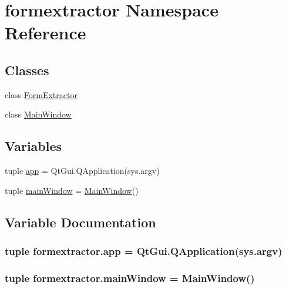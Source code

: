 \hypertarget{namespaceformextractor}{}\section{formextractor Namespace Reference}
\label{namespaceformextractor}
\subsection*{Classes}
\begin{DoxyCompactItemize}
\item 
class \hyperlink{classformextractor_1_1FormExtractor}{Form\+Extractor}
\item 
class \hyperlink{classformextractor_1_1MainWindow}{Main\+Window}
\end{DoxyCompactItemize}
\subsection*{Variables}
\begin{DoxyCompactItemize}
\item 
tuple \hyperlink{namespaceformextractor_ad143a6e2821eeaca2d839faa2ede63d0}{app} = Qt\+Gui.\+Q\+Application(sys.\+argv)
\item 
tuple \hyperlink{namespaceformextractor_ac95c0c9d23d851e3841e1bbfa52dc743}{main\+Window} = \hyperlink{classformextractor_1_1MainWindow}{Main\+Window}()
\end{DoxyCompactItemize}


\subsection{Variable Documentation}
\hypertarget{namespaceformextractor_ad143a6e2821eeaca2d839faa2ede63d0}{}
\subsubsection[{app}]{\setlength{\rightskip}{0pt plus 5cm}tuple formextractor.\+app = Qt\+Gui.\+Q\+Application(sys.\+argv)}\label{namespaceformextractor_ad143a6e2821eeaca2d839faa2ede63d0}
\hypertarget{namespaceformextractor_ac95c0c9d23d851e3841e1bbfa52dc743}{}
\subsubsection[{main\+Window}]{\setlength{\rightskip}{0pt plus 5cm}tuple formextractor.\+main\+Window = {\bf Main\+Window}()}\label{namespaceformextractor_ac95c0c9d23d851e3841e1bbfa52dc743}
